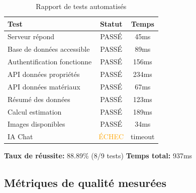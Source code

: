 \documentclass[12pt,a4paper]{report}
\begin{document}
\begin{table}[H]
    \centering
    \caption{Rapport de tests automatisés}
    \begin{tabular}{|l|c|c|}
        \hline
        \textbf{Test} & \textbf{Statut} & \textbf{Temps} \\
        \hline
        Serveur répond & \textcolor{verthousy}{PASSÉ} & 45ms \\
        \hline
        Base de données accessible & \textcolor{verthousy}{PASSÉ} & 89ms \\
        \hline
        Authentification fonctionne & \textcolor{verthousy}{PASSÉ} & 156ms \\
        \hline
        API données propriétés & \textcolor{verthousy}{PASSÉ} & 234ms \\
        \hline
        API données matériaux & \textcolor{verthousy}{PASSÉ} & 67ms \\
        \hline
        Résumé des données & \textcolor{verthousy}{PASSÉ} & 123ms \\
        \hline
        Calcul estimation & \textcolor{verthousy}{PASSÉ} & 189ms \\
        \hline
        Images disponibles & \textcolor{verthousy}{PASSÉ} & 34ms \\
        \hline
        IA Chat & \textcolor{orange}{ÉCHEC} & timeout \\
        \hline
    \end{tabular}
\end{table}

\textbf{Taux de réussite:} 88.89\% (8/9 tests)  
\textbf{Temps total:} 937ms

\subsection{Métriques de qualité mesurées}
\end{document}
